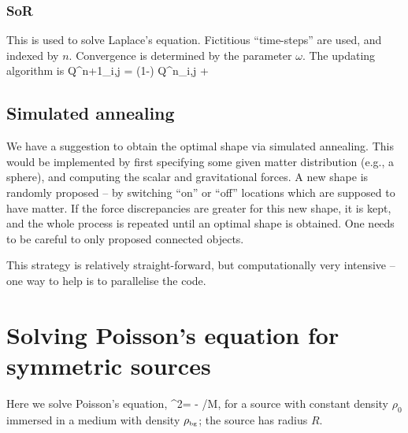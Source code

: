 \documentclass[a4paper, 12pt]{article}
\numberwithin{equation}{section}
\begin{document}
\subsubsection{SoR} 
This is used to solve Laplace's equation. Fictitious ``time-steps'' are used, and indexed by $n$. Convergence is determined by the parameter $\omega$. The updating algorithm is
\bea
Q^{n+1}_{i,j} = (1-\omega) Q^{n}_{i,j} + 
\eea

\subsection{Simulated annealing}
We have a suggestion to obtain the optimal shape via simulated annealing. This would be implemented by first specifying some given matter distribution (e.g., a sphere), and computing the scalar and gravitational forces. A new shape is randomly proposed -- by switching ``on'' or ``off'' locations which are supposed to have matter. If the force discrepancies are greater for this new shape, it is kept, and the whole process is repeated until an optimal shape is obtained. One needs to be careful to only proposed connected objects.

This strategy is relatively straight-forward, but computationally very intensive -- one way to help is to parallelise the code.
\section{Solving Poisson's equation for symmetric sources}
\label{poissonseqsoln}
Here we solve Poisson's equation, 
\bea
\nabla^2\Phi = - \rho /M,
\eea
for a source with constant density $\rho_0$ immersed in a medium with density ${\rho}_{\scriptscriptstyle{\textrm{bg}}}$; the source has radius $R$.
\end{document}
